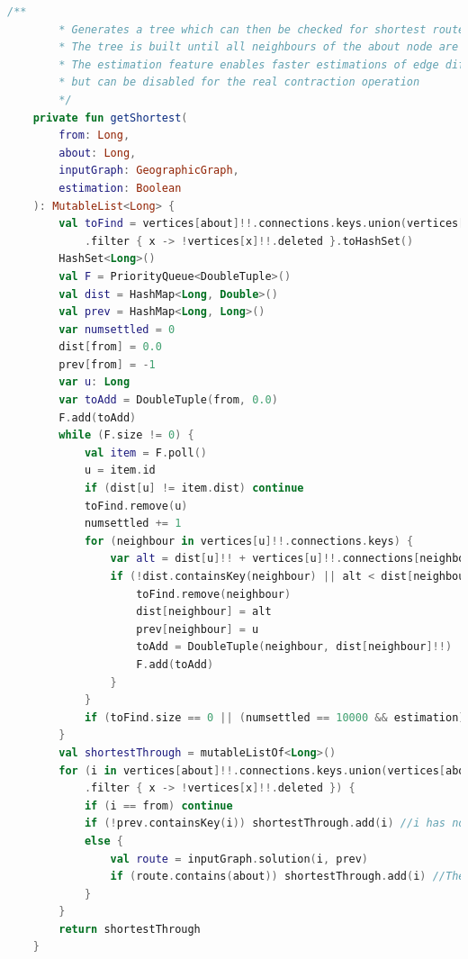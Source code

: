 \documentclass[11pt,twoside,a4paper]{report}
\begin{document}
\begin{lstlisting}[language=kotlin]
    /**
        * Generates a tree which can then be checked for shortest routes
        * The tree is built until all neighbours of the about node are found, then queried to find if the shortest route goes through the about node
        * The estimation feature enables faster estimations of edge differences by terminating the search after a given number of nodes,
        * but can be disabled for the real contraction operation
        */
    private fun getShortest(
        from: Long,
        about: Long,
        inputGraph: GeographicGraph,
        estimation: Boolean
    ): MutableList<Long> {
        val toFind = vertices[about]!!.connections.keys.union(vertices[about]!!.shortcutConnections.keys)
            .filter { x -> !vertices[x]!!.deleted }.toHashSet()
        HashSet<Long>()
        val F = PriorityQueue<DoubleTuple>()
        val dist = HashMap<Long, Double>()
        val prev = HashMap<Long, Long>()
        var numsettled = 0
        dist[from] = 0.0
        prev[from] = -1
        var u: Long
        var toAdd = DoubleTuple(from, 0.0)
        F.add(toAdd)
        while (F.size != 0) {
            val item = F.poll()
            u = item.id
            if (dist[u] != item.dist) continue
            toFind.remove(u)
            numsettled += 1
            for (neighbour in vertices[u]!!.connections.keys) {
                var alt = dist[u]!! + vertices[u]!!.connections[neighbour]!!
                if (!dist.containsKey(neighbour) || alt < dist[neighbour]!!) {
                    toFind.remove(neighbour)
                    dist[neighbour] = alt
                    prev[neighbour] = u
                    toAdd = DoubleTuple(neighbour, dist[neighbour]!!)
                    F.add(toAdd)
                }
            }
            if (toFind.size == 0 || (numsettled == 10000 && estimation)) break
        }
        val shortestThrough = mutableListOf<Long>()
        for (i in vertices[about]!!.connections.keys.union(vertices[about]!!.shortcutConnections.keys)
            .filter { x -> !vertices[x]!!.deleted }) {
            if (i == from) continue
            if (!prev.containsKey(i)) shortestThrough.add(i) //i has not been reached because contraction has been terminated early, therefore a shortcut is necessary
            else {
                val route = inputGraph.solution(i, prev)
                if (route.contains(about)) shortestThrough.add(i) //The shortest route goes through the node therefore a shortcut is necessary
            }
        }
        return shortestThrough
    }


\end{lstlisting}
\end{document}
